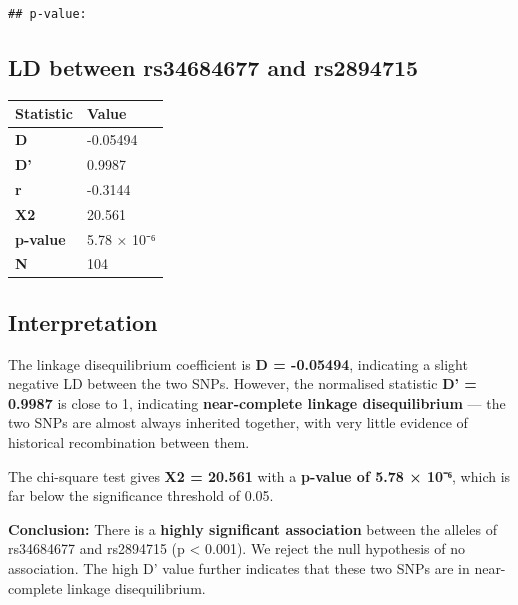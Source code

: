 \documentclass[
]{article}
\newenvironment{Shaded}{\begin{snugshade}}{\end{snugshade}}
\newcommand{\AttributeTok}[1]{\textcolor[rgb]{0.13,0.29,0.53}{#1}}
\newcommand{\FunctionTok}[1]{\textcolor[rgb]{0.13,0.29,0.53}{\textbf{#1}}}
\newcommand{\NormalTok}[1]{#1}
\newcommand{\SpecialCharTok}[1]{\textcolor[rgb]{0.81,0.36,0.00}{\textbf{#1}}}
\newcommand{\StringTok}[1]{\textcolor[rgb]{0.31,0.60,0.02}{#1}}
\newcounter{none} %
\begin{document}
\begin{Shaded}
\end{Shaded}

\begin{verbatim}
## p-value:
\end{verbatim}

\subsection{LD between rs34684677 and
rs2894715}\label{ld-between-rs34684677-and-rs2894715}

{\def\LTcaptype{none} %
\begin{longtable}[]{@{}ll@{}}
\toprule\noalign{}
Statistic & Value \\
\midrule\noalign{}
\endhead
\bottomrule\noalign{}
\endlastfoot
\textbf{D} & -0.05494 \\
\textbf{D'} & 0.9987 \\
\textbf{r} & -0.3144 \\
\textbf{X2} & 20.561 \\
\textbf{p-value} & 5.78 × 10⁻⁶ \\
\textbf{N} & 104 \\
\end{longtable}
}

\subsection{Interpretation}\label{interpretation}

The linkage disequilibrium coefficient is \textbf{D = -0.05494},
indicating a slight negative LD between the two SNPs. However, the
normalised statistic \textbf{D' = 0.9987} is close to 1, indicating
\textbf{near-complete linkage disequilibrium} --- the two SNPs are
almost always inherited together, with very little evidence of
historical recombination between them.

The chi-square test gives \textbf{X2 = 20.561} with a \textbf{p-value of
5.78 × 10⁻⁶}, which is far below the significance threshold of 0.05.

\textbf{Conclusion:} There is a \textbf{highly significant association}
between the alleles of rs34684677 and rs2894715 (p \textless{} 0.001).
We reject the null hypothesis of no association. The high D' value
further indicates that these two SNPs are in near-complete linkage
disequilibrium.
\end{document}
